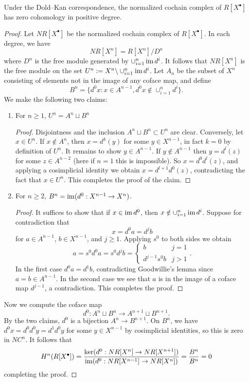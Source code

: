\begin{prop}\label{prop:goodwillie_cor}
  Under the Dold--Kan correspondence, the normalized cochain complex of $R[X^\bullet]$ has zero cohomology in positive degree.
  \begin{proof}
  Let $NR[X^\bullet]$ be the normalized cochain complex of $R[X^\bullet]$. In each degree, we have 
  \[NR[X^n] = R[X^n] / D^n\]
  where $D^n$ is the free module generated by $\cup_{i=1}^n \operatorname{im} d^i$. It follows that $NR[X^n]$ is the free module on the set $U^n:=X^n \backslash \cup_{i=1}^n \operatorname{im} d^i$. Let $A_n$ be the subset of $X^n$ consisting of elements not in the image of any coface map, and define 
  \[B^n = \{d^0x: x \in A^{n-1}, d^0x \notin \cup_{i=1}^n d^i\}.\]
  We make the following two claims:
  \begin{enumerate}
    \item For $n\geq 1$, $U^n = A^n \sqcup B^n$ 
    \begin{proof}
      Disjointness and the inclusion $A^n\sqcup B^n \subset U^n$ are clear. Conversely, let $x \in U^n$. If $x \notin A^n$, then $x = d^k(y)$ for some $y \in X^{n-1}$, in fact $k=0$ by definition of $U^n$. It remains to show $y \in A^{n-1}$. If $y \notin A^{n-1}$ then $y = d^l(z)$ for some $z \in A^{n-2}$ (here if $n=1$ this is impossible). So $x = d^0d^l(z)$, and applying a cosimplicial identity we obtain $x = d^{l+1}d^0(z)$, contradicting the fact that $x \in U^n$. This completes the proof of the claim.
    \end{proof}
    \item For $n\geq 2$, $B^n = \operatorname{im}(d^0: X^{n-1}\to X^n)$.
    \begin{proof}
      It suffices to show that if $x \in \operatorname{im} d^0$, then $x \notin \cup_{i=1}^n \operatorname{im} d^i$. Suppose for contradiction that 
      \[x = d^0a = d^jb\]
      for $a \in A^{n-1}$, $b \in X^{n-1}$, and $j\geq 1$. Applying $s^0$ to both sides we obtain
      \[a = s^0d^0a = s^0d^jb = \begin{cases}
      b & j=1 \\
      d^{j-1}s^0b & j>1
      \end{cases}.\]
      In the first case $d^0a = d^1b$, contradicting Goodwillie's lemma since $a=b \in A^{n-1}$. In the second case we see that $a$ is in the image of a coface map $d^{j-1}$, a contradiction. This completes the proof.
    \end{proof}
  \end{enumerate}
  Now we compute the coface map 
  \[d^0: A^n \sqcup B^n \to A^{n+1}\sqcup B^{n+1}.\]
  By the two claims, $d^0$ is a bijection $A^n \to B^{n+1}$. On $B^n$, we have $d^0x = d^0d^0y = d^1d^0y$ for some $y \in X^{n-1}$ by cosimplicial identities, so this is zero in $NC^{n}$. It follows that 
  \[H^n(R[X^\bullet]) = \frac{\ker (d^0: NR[X^n] \to NR[X^{n+1}])}{\operatorname{im}(d^0: NR[X^{n-1}]\to NR[X^n])} = \frac{B^n}{B^n} = 0\]
  completing the proof.
  \end{proof}
\end{prop}

